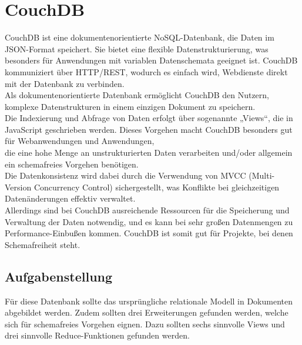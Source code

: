 
\section{CouchDB}
CouchDB ist eine dokumentenorientierte NoSQL-Datenbank, die Daten im JSON-Format speichert. Sie bietet eine flexible Datenstrukturierung, was besonders für Anwendungen mit variablen Datenschemata geeignet ist.
CouchDB kommuniziert über HTTP/REST, wodurch es einfach wird, Webdienste direkt mit der Datenbank zu verbinden.\\
Als dokumentenorientierte Datenbank ermöglicht CouchDB den Nutzern, komplexe Datenstrukturen in einem einzigen Dokument zu speichern. \\
Die Indexierung und Abfrage von Daten erfolgt über sogenannte „Views“, die in JavaScript geschrieben werden. Dieses Vorgehen macht CouchDB besonders gut für Webanwendungen und Anwendungen,\\
die eine hohe Menge an unstrukturierten Daten verarbeiten und/oder allgemein ein schemafreies Vorgehen benötigen.\\
Die Datenkonsistenz wird dabei durch die Verwendung von MVCC (Multi-Version Concurrency Control) sichergestellt, was Konflikte bei gleichzeitigen Datenänderungen effektiv verwaltet.\\
Allerdings sind bei CouchDB ausreichende Ressourcen für die Speicherung und Verwaltung der Daten notwendig, und es kann bei sehr großen Datenmengen zu Performance-Einbußen kommen.
CouchDB ist somit gut für Projekte, bei denen Schemafreiheit steht.

\vspace{18pt}

\subsection{Aufgabenstellung}
Für diese Datenbank sollte das ursprüngliche relationale Modell in Dokumenten abgebildet werden. Zudem sollten drei Erweiterungen gefunden werden, welche sich für schemafreies Vorgehen eignen.
Dazu sollten sechs sinnvolle Views und drei sinnvolle Reduce-Funktionen gefunden werden.

